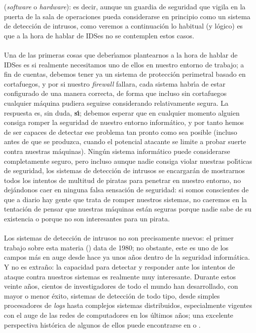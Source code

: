 ({\it software} o {\it hardware}): es decir, aunque un guardia de seguridad 
que vigila en la puerta de la sala de operaciones pueda considerarse en 
principio como un sistema de detecci\'on de intrusos, como veremos a 
continuaci\'on lo habitual (y l\'ogico) es que a la hora de hablar de IDSes no
se contemplen estos casos.\\
\\Una de las primeras cosas que deber\'{\i}amos plantearnos a la hora de hablar
de IDSes es si realmente necesitamos uno de ellos en nuestro entorno de trabajo;
a fin de cuentas, debemos tener ya un sistema de protecci\'on perimetral basado
en cortafuegos, y por si nuestro {\it firewall} fallara, cada sistema 
habr\'{\i}a de estar configurado de una manera correcta, de forma que incluso 
sin cortafuegos cualquier m\'aquina pudiera seguirse considerando relativamente 
segura. La
respuesta es, sin duda, {\bf s\'{\i}}; debemos esperar que en cualquier momento
alguien consiga romper la seguridad de nuestro entorno inform\'atico, y por 
tanto hemos de ser capaces de detectar ese problema tan pronto como sea posible
(incluso antes de que se produzca, cuando el potencial atacante se limite a
probar suerte contra nuestras m\'aquinas). Ning\'un sistema inform\'atico puede
considerarse completamente seguro, pero incluso aunque nadie consiga 
violar nuestras pol\'{\i}ticas de seguridad, los sistemas de detecci\'on de 
intrusos se encargar\'an de mostrarnos todos los intentos de multitud 
de piratas para penetrar en nuestro entorno, no dej\'andonos caer en ninguna 
falsa sensaci\'on de seguridad: si somos conscientes de que a diario hay gente
que trata de romper nuestros sistemas, no caeremos en la tentaci\'on de pensar
que nuestras m\'aquinas est\'an seguras porque nadie sabe de su existencia o
porque no son interesantes para un pirata.\\
\\Los sistemas de detecci\'on de intrusos no son precisamente nuevos: el primer 
trabajo sobre esta materia (\cite{kn:and80}) data de 1980; no obstante, este 
es uno de los campos m\'as en auge desde hace ya unos a\~nos dentro de la 
seguridad inform\'atica. Y no es extra\~no: la capacidad para detectar y
responder ante los intentos de ataque contra nuestros sistemas es realmente
muy interesante. Durante estos veinte a\~nos, cientos de investigadores de
todo el mundo han desarrollado, con mayor o menor \'exito, sistemas de 
detecci\'on de todo tipo, desde simples procesadores de {\it logs} hasta 
complejos sistemas distribuidos, especialmente vigentes con el auge de las 
redes de computadores en los \'ultimos a\~nos; una excelente perspectiva 
hist\'orica de algunos de ellos puede encontrarse en \cite{kn:jay95} o 
\cite{kn:axe98b}.
